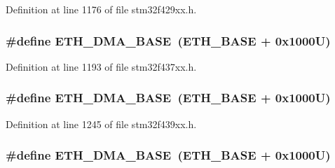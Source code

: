 Definition at line 1176 of file stm32f429xx.\+h.

\subsubsection[{\texorpdfstring{E\+T\+H\+\_\+\+D\+M\+A\+\_\+\+B\+A\+SE}{ETH_DMA_BASE}}]{\setlength{\rightskip}{0pt plus 5cm}\#define E\+T\+H\+\_\+\+D\+M\+A\+\_\+\+B\+A\+SE~({\bf E\+T\+H\+\_\+\+B\+A\+SE} + 0x1000\+U)}\hypertarget{group___peripheral__memory__map_gace2114e1b37c1ba88d60f3e831b67e93}{}\label{group___peripheral__memory__map_gace2114e1b37c1ba88d60f3e831b67e93}


Definition at line 1193 of file stm32f437xx.\+h.

\subsubsection[{\texorpdfstring{E\+T\+H\+\_\+\+D\+M\+A\+\_\+\+B\+A\+SE}{ETH_DMA_BASE}}]{\setlength{\rightskip}{0pt plus 5cm}\#define E\+T\+H\+\_\+\+D\+M\+A\+\_\+\+B\+A\+SE~({\bf E\+T\+H\+\_\+\+B\+A\+SE} + 0x1000\+U)}\hypertarget{group___peripheral__memory__map_gace2114e1b37c1ba88d60f3e831b67e93}{}\label{group___peripheral__memory__map_gace2114e1b37c1ba88d60f3e831b67e93}


Definition at line 1245 of file stm32f439xx.\+h.

\subsubsection[{\texorpdfstring{E\+T\+H\+\_\+\+D\+M\+A\+\_\+\+B\+A\+SE}{ETH_DMA_BASE}}]{\setlength{\rightskip}{0pt plus 5cm}\#define E\+T\+H\+\_\+\+D\+M\+A\+\_\+\+B\+A\+SE~({\bf E\+T\+H\+\_\+\+B\+A\+SE} + 0x1000\+U)}\hypertarget{group___peripheral__memory__map_gace2114e1b37c1ba88d60f3e831b67e93}{}\label{group___peripheral__memory__map_gace2114e1b37c1ba88d60f3e831b67e93}


